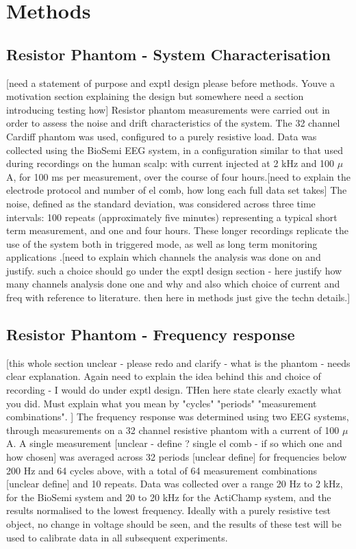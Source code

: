 \section{Methods}


\subsection{Resistor Phantom - System Characterisation}

[need a statement of purpose and exptl design please before methods. Youve a motivation section explaining the design but somewhere need a section introducing testing how]
Resistor phantom measurements were carried out in order to assess the noise and drift characteristics of the system. The 32 channel Cardiff phantom \cite{griffiths1995cole} was used, configured to a purely resistive load.  Data was collected using the BioSemi EEG system, in a configuration similar to that used during recordings on the human scalp: with current injected at 2 kHz and 100 $\mu$ A, for 100 ms per measurement, over the course of four hours.[need to explain the electrode protocol and number of el comb, how long each full data set takes] The noise, defined as the standard deviation, was considered across three time intervals: 100 repeats (approximately five minutes) representing a typical short term measurement, and one and four hours. These longer recordings replicate the use of the system both in triggered mode, as well as long term monitoring applications \cite{fu2014use} \cite{adler2012whither}.[need to explain which channels the analysis was done on and justify. such a choice should go under the exptl design section - here justify how many channels analysis done one and why and also which choice of current and freq with reference to literature. then here in methods just give the techn details.]

\subsection{Resistor Phantom - Frequency response}

[this whole section unclear - please redo and clarify - what is the phantom - needs clear explanation. Again need to explain the idea behind this and choice of recording - I would do under exptl design. THen here state clearly exactly what you did.  Must explain what you mean by "cycles" "periods" "measurement combinations". ] The frequency response was determined using two EEG systems, through measurements on a 32 channel resistive phantom with a current of 100 $\mu$ A. A single measurement [unclear - define ? single el comb - if so which one and how chosen] was averaged across 32 periods [unclear define] for frequencies below 200 Hz and 64 cycles above, with a total of 64 measurement combinations [unclear define] and 10 repeats. Data was collected over a range 20 Hz to 2 kHz, for the BioSemi system and 20 to 20 kHz for the ActiChamp system, and the results normalised to the lowest frequency.  Ideally with a purely resistive test object, no change in voltage should be seen, and the results of these test will be used to calibrate data in all subsequent experiments.

